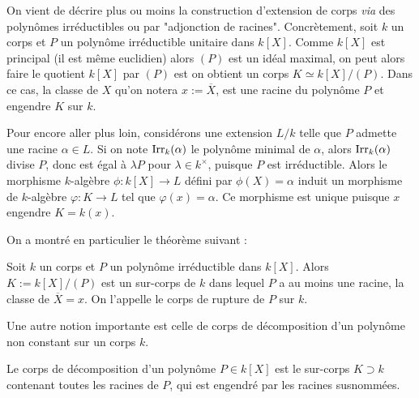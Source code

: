 \documentclass[a4paper]{article} %
\numberwithin{section}{part}
\numberwithin{equation}{section}
\newcommand\Irr[2]{\textup{Irr}_{#1}(#2)}
\begin{document}
On vient de décrire plus ou moins la construction d'extension de corps 
\textit{via} des polynômes irréductibles ou par "adjonction de racines". 
Concrètement, soit $k$ un corps et $P$ un polynôme irréductible unitaire 
dans $k[X]$. Comme $k[X]$ est principal (il est même euclidien) alors $(P)$ est 
un idéal maximal, on peut alors faire le quotient $k[X]$ par $(P)$ est on 
obtient un corps $K \simeq k[X]/(P)$. Dans ce cas, la classe de $X$ qu'on notera
$x := \overline{X}$, est une racine du polynôme $P$ et engendre $K$ sur $k$.\par
Pour encore aller plus loin, considérons une extension $L/k$ telle que $P$ 
admette une racine $\alpha\in L$. Si on note $\Irr{k}{\alpha}$ le polynôme 
minimal de $\alpha$, alors $\Irr{k}{\alpha}$ divise $P$, donc est égal à 
$\lambda P$ pour $\lambda\in k^{\times}$, puisque $P$ est irréductible. Alors 
le morphisme $k$-algèbre $\phi : k[X] \to L$ défini par $\phi(X) = \alpha$ 
induit un morphisme de $k$-algèbre $\varphi : K \to L$ tel que $\varphi(x) 
= \alpha$. Ce morphisme est unique puisque $x$ engendre $K = k(x)$.\par
\vspace{0.3cm}
On a montré en particulier le théorème suivant :

\begin{thm}
Soit $k$ un corps et $P$ un polynôme irréductible dans $k[X]$. Alors $K := 
k[X]/(P)$ est un sur-corps de $k$ dans lequel $P$ a au moins une racine, la 
classe de $\overline{X} = x$. On l'appelle le corps de rupture de $P$ sur 
$k$.\par
\end{thm}

Une autre notion importante est celle de corps de décomposition d'un polynôme 
non constant sur un corps $k$.

\begin{defn}
\label{defdec}
Le corps de décomposition d'un polynôme $P\in k[X]$ est le sur-corps $K \supset 
k$ contenant toutes les racines de $P$, qui est engendré par les racines 
susnommées.
\end{defn}
\end{document}
